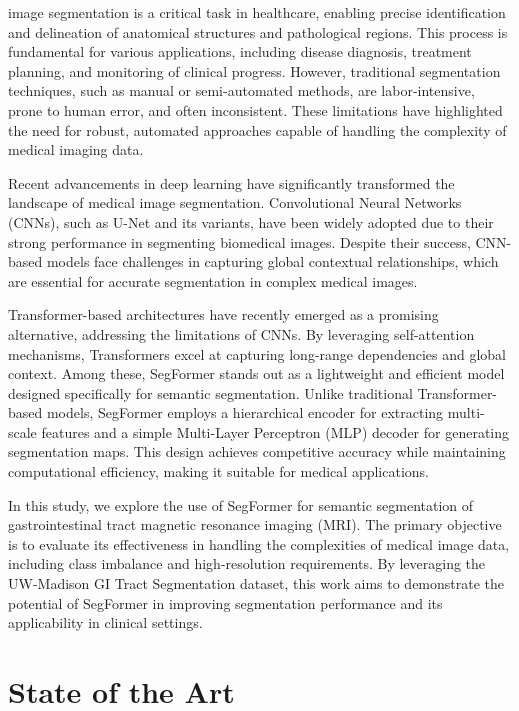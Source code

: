 \documentclass[journal]{IEEEtran}
\begin{document}
 image segmentation is a critical task in healthcare, enabling precise identification and delineation of anatomical structures and pathological regions. This process is fundamental for various applications, including disease diagnosis, treatment planning, and monitoring of clinical progress. However, traditional segmentation techniques, such as manual or semi-automated methods, are labor-intensive, prone to human error, and often inconsistent. These limitations have highlighted the need for robust, automated approaches capable of handling the complexity of medical imaging data.

Recent advancements in deep learning have significantly transformed the landscape of medical image segmentation. Convolutional Neural Networks (CNNs), such as U-Net and its variants, have been widely adopted due to their strong performance in segmenting biomedical images. Despite their success, CNN-based models face challenges in capturing global contextual relationships, which are essential for accurate segmentation in complex medical images.

Transformer-based architectures have recently emerged as a promising alternative, addressing the limitations of CNNs. By leveraging self-attention mechanisms, Transformers excel at capturing long-range dependencies and global context. Among these, SegFormer stands out as a lightweight and efficient model designed specifically for semantic segmentation. Unlike traditional Transformer-based models, SegFormer employs a hierarchical encoder for extracting multi-scale features and a simple Multi-Layer Perceptron (MLP) decoder for generating segmentation maps. This design achieves competitive accuracy while maintaining computational efficiency, making it suitable for medical applications.

In this study, we explore the use of SegFormer for semantic segmentation of gastrointestinal tract magnetic resonance imaging (MRI). The primary objective is to evaluate its effectiveness in handling the complexities of medical image data, including class imbalance and high-resolution requirements. By leveraging the UW-Madison GI Tract Segmentation dataset, this work aims to demonstrate the potential of SegFormer in improving segmentation performance and its applicability in clinical settings.

\section{State of the Art}
\end{document}
